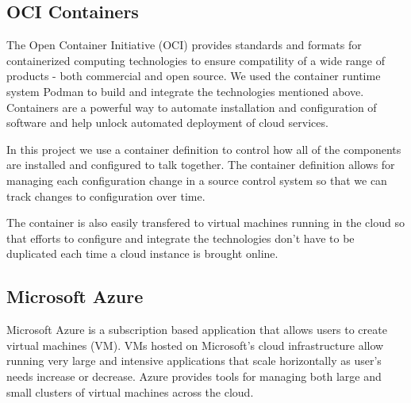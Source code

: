 \documentclass[conference,twoside]{IEEEtran}
\begin{document}
\subsection{OCI Containers}
The Open Container Initiative (OCI) provides standards and formats for containerized computing technologies to ensure compatility of a wide range of products - both commercial and open source\cite{OCI}. We used the container runtime system Podman\cite{rhelpodman} to build and integrate the technologies mentioned above. Containers are a powerful way to automate installation and configuration of software and help unlock automated deployment of cloud services\cite{gartnercontainer}.

In this project we use a container definition to control how all of the components are installed and configured to talk together. The container definition allows for managing each configuration change in a source control system so that we can track changes to configuration over time.

The container is also easily transfered to virtual machines running in the cloud so that efforts to configure and integrate the technologies don't have to be duplicated each time a cloud instance is brought online.

\subsection{Microsoft Azure}
Microsoft Azure is a subscription based application that allows users to create virtual machines (VM). VMs hosted on Microsoft's cloud infrastructure allow running very large and intensive applications that scale horizontally as user's needs increase or decrease. Azure provides tools for managing both large and small clusters of virtual machines across the cloud\cite{azure}.
\end{document}
